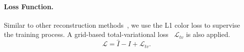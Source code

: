         

     



\paragraph{Loss Function.}
Similar to other reconstruction methods~\cite{3dgs,pumarola2021dnerf,tineuvox}, we use the L1 color loss to supervise the training process. A grid-based total-variational loss~\cite{dvgo,tineuvox,hexplane,kplanes} $\mathcal{L}_{tv}$ is also applied.
\begin{equation}
    \mathcal{L} = \hat{I} - I + \mathcal{L}_{tv}.
\end{equation}
